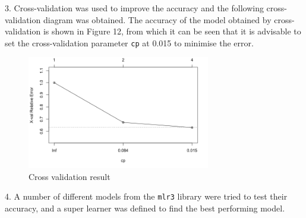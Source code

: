 \documentclass{article}
\begin{document}
\begin{figure}[htbp]
\centering

%
%

\centering
\end{figure}


3. Cross-validation was used to improve the accuracy and the following cross-validation diagram was obtained. The accuracy of the model obtained by cross-validation is shown in Figure 12, from which it can be seen that it is advisable to set the cross-validation parameter \verb|cp| at 0.015 to minimise the error.

\begin{figure}[ht]
\centering
\includegraphics[width=8cm]{val.png} %
\caption{Cross validation result} %
\end{figure}


4. A number of different models from the \verb|mlr3| library were tried to test their accuracy, and a super learner was defined to find the best performing model. 
\end{document}
